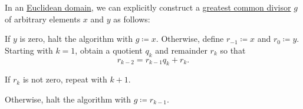 \begin{algorithm}\label{alg:euclidean_algorithm}
  In an \hyperref[def:euclidean_domain]{Euclidean domain}, we can explicitly construct a \hyperref[def:gcd]{greatest common divisor} \( g \) of arbitrary elements \( x \) and \( y \) as follows:
  \begin{thmenum}
     If \( y \) is zero, halt the algorithm with \( g \coloneqq x \).
     Otherwise, define \( r_{-1} \coloneqq x \) and \( r_0 \coloneqq y \).
     Starting with \( k = 1 \), obtain a quotient \( q_k \) and remainder \( r_k \) so that
    \begin{equation*}
      r_{k-2} = r_{k-1} q_k + r_k.
    \end{equation*}

    If \( r_k \) is not zero, repeat  with \( k + 1 \).

    Otherwise, halt the algorithm with \( g \coloneqq r_{k-1} \).
  \end{thmenum}
\end{algorithm}
